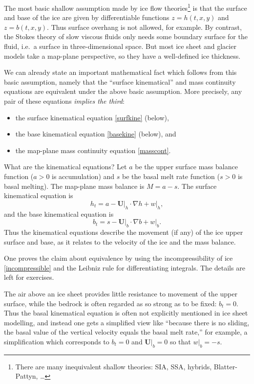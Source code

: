 \documentclass[titlepage,a4paper,final,12pt]{scrartcl}
\newcommand{\grad}{\nabla}
\begin{document}
The most basic shallow assumption made by ice flow theories\footnote{There are many inequivalent shallow theories: SIA, SSA, hybrids, Blatter-Pattyn, \dots} is that the surface and base of the ice are given by differentiable functions $z=h(t,x,y)$ and $z=b(t,x,y)$.  Thus surface overhang is not allowed, for example.  By contrast, the Stokes theory of slow viscous fluids only needs some boundary surface for the fluid, i.e.~a surface in three-dimensional space.  But most ice sheet and glacier models take a map-plane perspective, so they have a well-defined ice thickness.

We can already state an important mathematical fact which follows from this basic assumption, namely that the ``surface kinematical'' and mass continuity equations are equivalent under the above basic assumption.  More precisely, any pair of these equations \emph{implies the third}:
  \begin{itemize}
  \item the surface kinematical equation \eqref{surfkine} (below),
  \item the base kinematical equation \eqref{basekine} (below), and
  \item the map-plane mass continuity equation \eqref{masscont}.
  \end{itemize}

What are the kinematical equations?  Let $a$ be the upper surface mass balance function ($a>0$ is accumulation) and $s$ be the basal melt rate function ($s>0$ is basal melting).  The map-plane mass balance is $M=a-s$.  The surface kinematical equation is 
\begin{equation}
h_t = a - \mathbf{U}\big|_h \cdot \grad h + w\big|_h,  \label{surfkine}
\end{equation}
and the base kinematical equation is
\begin{equation}
b_t = s - \mathbf{U}\big|_b \cdot \grad b + w\big|_b.  \label{basekine}
\end{equation}
Thus the kinematical equations describe the movement (if any) of the ice upper surface and base, as it relates to the velocity of the ice and the mass balance.

One proves the claim about equivalence by using the incompressibility of ice \eqref{incompressible} and the Leibniz rule for differentiating integrals.  The details are left for exercises.

The air above an ice sheet provides little resistance to movement of the upper surface, while the bedrock is often regarded as so strong as to be fixed: $b_t=0$.  Thus the basal kinematical equation is often not explicitly mentioned in ice sheet modelling, and instead one gets a simplified view like ``because there is no sliding, the basal value of the vertical velocity equals the basal melt rate,'' for example, a simplification which corresponds to $b_t=0$ and $\mathbf{U}\big|_b=0$ so that $w\big|_b=-s$.
\end{document}

